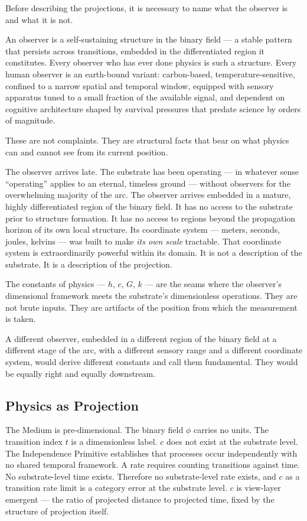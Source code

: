 \documentclass[11pt,letterpaper]{article}
\begin{document}
Before describing the projections, it is necessary to name what the observer is and what it is not.

An observer is a self-sustaining structure in the binary field --- a stable pattern that persists across transitions, embedded in the differentiated region it constitutes. Every observer who has ever done physics is such a structure. Every human observer is an earth-bound variant: carbon-based, temperature-sensitive, confined to a narrow spatial and temporal window, equipped with sensory apparatus tuned to a small fraction of the available signal, and dependent on cognitive architecture shaped by survival pressures that predate science by orders of magnitude.

These are not complaints. They are structural facts that bear on what physics can and cannot see from its current position.

The observer arrives late. The substrate has been operating --- in whatever sense ``operating'' applies to an eternal, timeless ground --- without observers for the overwhelming majority of the arc. The observer arrives embedded in a mature, highly differentiated region of the binary field. It has no access to the substrate prior to structure formation. It has no access to regions beyond the propagation horizon of its own local structure. Its coordinate system --- meters, seconds, joules, kelvins --- was built to make \emph{its own scale} tractable. That coordinate system is extraordinarily powerful within its domain. It is not a description of the substrate. It is a description of the projection.

The constants of physics --- \(h\), \(c\), \(G\), \(k\) --- are the seams where the observer's dimensional framework meets the substrate's dimensionless operations. They are not brute inputs. They are artifacts of the position from which the measurement is taken.

A different observer, embedded in a different region of the binary field at a different stage of the arc, with a different sensory range and a different coordinate system, would derive different constants and call them fundamental. They would be equally right and equally downstream.

\subsection{Physics as Projection}
\label{sec:orgb08918c}

The Medium is pre-dimensional. The binary field \(\phi\) carries no units. The transition index \(t\) is a dimensionless label. \(c\) does not exist at the substrate level. The Independence Primitive establishes that processes occur independently with no shared temporal framework. A rate requires counting transitions against time. No substrate-level time exists. Therefore no substrate-level rate exists, and \(c\) as a transition rate limit is a category error at the substrate level. \(c\) is view-layer emergent --- the ratio of projected distance to projected time, fixed by the structure of projection itself.
\end{document}
